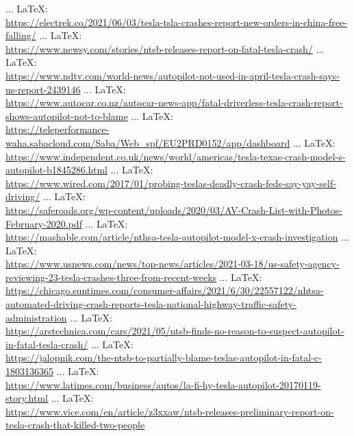 \begin{thebibliography}{99}
{{{{{ ... \LaTeX:\\ \url{https://electrek.co/2021/06/03/tesla-tsla-crashes-report-new-orders-in-china-free-falling/}
 ... \LaTeX:\\ \url{https://www.newsy.com/stories/ntsb-releases-report-on-fatal-tesla-crash/}
 ... \LaTeX:\\ \url{https://www.ndtv.com/world-news/autopilot-not-used-in-april-tesla-crash-says-us-report-2439146}
 ... \LaTeX:\\ \url{https://www.autocar.co.nz/autocar-news-app/fatal-driverless-tesla-crash-report-shows-autopilot-not-to-blame}
 ... \LaTeX:\\ \url{https://teleperformance-waha.sabacloud.com/Saba/Web_spf/EU2PRD0152/app/dashboard}
 ... \LaTeX:\\ \url{https://www.independent.co.uk/news/world/americas/tesla-texas-crash-model-s-autopilot-b1845286.html}
 ... \LaTeX:\\ \url{https://www.wired.com/2017/01/probing-teslas-deadly-crash-feds-say-yay-self-driving/}
 ... \LaTeX:\\ \url{https://saferoads.org/wp-content/uploads/2020/03/AV-Crash-List-with-Photos-February-2020.pdf}
 ... \LaTeX:\\ \url{https://mashable.com/article/nthsa-tesla-autopilot-model-x-crash-investigation}
 ... \LaTeX:\\ \url{https://www.usnews.com/news/top-news/articles/2021-03-18/us-safety-agency-reviewing-23-tesla-crashes-three-from-recent-weeks}
 ... \LaTeX:\\ \url{https://chicago.suntimes.com/consumer-affairs/2021/6/30/22557122/nhtsa-automated-driving-crash-reports-tesla-national-highway-traffic-safety-administration}
 ... \LaTeX:\\ \url{https://arstechnica.com/cars/2021/05/ntsb-finds-no-reason-to-suspect-autopilot-in-fatal-tesla-crash/}
 ... \LaTeX:\\ \url{https://jalopnik.com/the-ntsb-to-partially-blame-teslas-autopilot-in-fatal-c-1803136365}
 ... \LaTeX:\\ \url{https://www.latimes.com/business/autos/la-fi-hy-tesla-autopilot-20170119-story.html}
 ... \LaTeX:\\ \url{https://www.vice.com/en/article/z3xxaw/ntsb-releases-preliminary-report-on-tesla-crash-that-killed-two-people}
}}}}}
\end{thebibliography}
